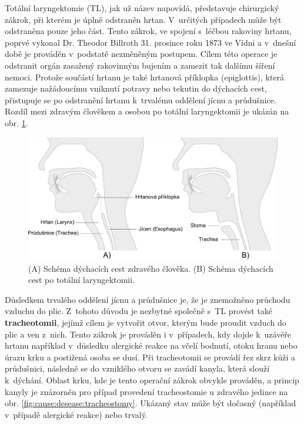 Totální laryngektomie (TL), jak už název napovídá, představuje chirurgický
zákrok, při kterém je úplně odstraněn hrtan. V~určitých případech může být
odstraněna pouze jeho část. Tento zákrok, ve spojení s~léčbou
rakoviny hrtanu, poprvé vykonal Dr. Theodor Billroth 31. prosince roku 1873 ve
Vídni \cite{Gussenbauer1874} a v~dnešní době je prováděn v~podstatě nezměněným postupem.
Cílem této operace je odstranit orgán zasažený rakovinným bujením a
zamezit tak dalšímu šíření nemoci. Protože součástí hrtanu je také hrtanová příklopka
(epiglottis), která zamezuje nažádoucímu vniknutí potravy nebo tekutin do
dýchacích cest, přistupuje se po odstranění hrtanu k~trvalému oddělení jícnu a průdušnice.
Rozdíl mezi zdravým člověkem a osobou po totální laryngektomii je ukázán na
obr. \ref{fig:cause:desease:laryngectomy}.

\begin{figure}[htb]
  \begin{center}
    \def\svgwidth{0.9\linewidth}
    \includegraphics[width=0.9\linewidth]{ch3-cause/figures/dychaci-cesty-tl}
    \caption[Schéma dýchacích cest zdravého člověka a pacienta po TL.]{(A) Schéma dýchacích cest zdravého člověka. (B) Schéma dýchacích cest po totální laryngektomii.}
    \label{fig:cause:desease:laryngectomy}
  \end{center}
\end{figure}

Důsledkem trvalého oddělení jícnu a průdušnice je, že je znemožněno průchodu vzduchu do plic.
Z~tohoto důvodu je nezbytné společně s~TL provést také \textbf{tracheotomii}, jejímž cílem je vytvořit otvor, kterým
bude proudit vzduch do plic a ven z~nich. Tento zákrok je prováděn i v~případech, kdy dojde k~uzávěře hrtanu například v~důsledku alergické reakce na včelí bodnutí, otoku hranu nebo úrazu krku a postižená osoba se dusí. Při tracheotomii se provádí řez skrz kůži a průdušnici, následně se do vzniklého
otvoru se zavádí kanyla, která slouží  k~dýchání. Oblast krku, kde je tento operační zákrok obvykle prováděn, a
princip kanyly je znázorněn pro případ provedení tracheostomie u zdravého jedince na obr. \ref{fig:cause:desease:tracheostomy}. Ukázaný stav může být dočasný (například v~případě alergické
reakce) nebo trvalý.

